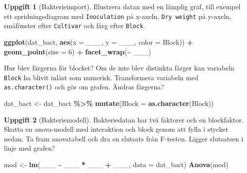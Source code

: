 \documentclass[
]{book}
\newenvironment{Shaded}{\begin{snugshade}}{\end{snugshade}}
\newcommand{\AttributeTok}[1]{\textcolor[rgb]{0.13,0.29,0.53}{#1}}
\newcommand{\DecValTok}[1]{\textcolor[rgb]{0.00,0.00,0.81}{#1}}
\newcommand{\FunctionTok}[1]{\textcolor[rgb]{0.13,0.29,0.53}{\textbf{#1}}}
\newcommand{\NormalTok}[1]{#1}
\newcommand{\OtherTok}[1]{\textcolor[rgb]{0.56,0.35,0.01}{#1}}
\newcommand{\SpecialCharTok}[1]{\textcolor[rgb]{0.81,0.36,0.00}{\textbf{#1}}}
\newcommand{\StringTok}[1]{\textcolor[rgb]{0.31,0.60,0.02}{#1}}
\theoremstyle{definition}
\theoremstyle{definition}
\theoremstyle{definition}
\newtheorem{exercise}{Uppgift}[chapter]
\theoremstyle{definition}
\theoremstyle{remark}
\begin{document}
\begin{exercise}[Bakterieimport]

Illustrera datan med en lämplig graf, till exempel ett spridningsdiagram med \texttt{Inoculation} på x-axeln, \texttt{Dry\ weight} på y-axeln, småfönster efter \texttt{Cultivar} och färg efter \texttt{Block}.

\begin{Shaded}
\begin{Highlighting}[]
\FunctionTok{ggplot}\NormalTok{(dat\_bact, }\FunctionTok{aes}\NormalTok{(}\AttributeTok{x =}\NormalTok{ \_\_\_, }\AttributeTok{y =} \StringTok{\textasciigrave{}}\AttributeTok{\_\_\_}\StringTok{\textasciigrave{}}\NormalTok{, }\AttributeTok{color =}\NormalTok{ Block)) }\SpecialCharTok{+}
  \FunctionTok{geom\_point}\NormalTok{(}\AttributeTok{size =} \DecValTok{6}\NormalTok{) }\SpecialCharTok{+}
  \FunctionTok{facet\_wrap}\NormalTok{(}\SpecialCharTok{\textasciitilde{}}\NormalTok{ \_\_\_)}
\end{Highlighting}
\end{Shaded}

Hur blev färgerna för blocket? Om de inte blev distinkta färger kan variabeln \texttt{Block} ha blivit inläst som numerisk. Transformera variabeln med \texttt{as.character()} och gör om grafen. Ändras färgerna?

\begin{Shaded}
\begin{Highlighting}[]
\NormalTok{dat\_bact }\OtherTok{\textless{}{-}}\NormalTok{ dat\_bact }\SpecialCharTok{\%\textgreater{}\%} 
  \FunctionTok{mutate}\NormalTok{(}\AttributeTok{Block =} \FunctionTok{as.character}\NormalTok{(Block))}
\end{Highlighting}
\end{Shaded}

\end{exercise}

\begin{exercise}[Bakteriemodell]

Bakteriedatan har två faktorer och en blockfaktor. Skatta en anova-modell med interaktion och block genom att fylla i stycket nedan. Ta fram anovatabell och dra en slutsats från F-testen. Ligger slutsatsen i linje med grafen?

\begin{Shaded}
\begin{Highlighting}[]
\NormalTok{mod }\OtherTok{\textless{}{-}} \FunctionTok{lm}\NormalTok{(}\StringTok{\textasciigrave{}}\AttributeTok{\_\_\_}\StringTok{\textasciigrave{}} \SpecialCharTok{\textasciitilde{}}\NormalTok{ \_\_\_ }\SpecialCharTok{*}\NormalTok{ \_\_\_ }\SpecialCharTok{+}\NormalTok{ \_\_\_, }\AttributeTok{data =}\NormalTok{ dat\_bact)}
\FunctionTok{Anova}\NormalTok{(mod)}
\end{Highlighting}
\end{Shaded}

\end{exercise}
\end{document}
